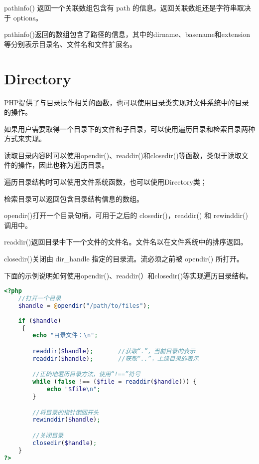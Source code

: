 pathinfo() 返回一个关联数组包含有 path 的信息。返回关联数组还是字符串取决于 options。



pathinfo()返回的数组包含了路径的信息，其中的dirname、basename和extension等分别表示目录名、文件名和文件扩展名。






\section{Directory}

PHP提供了与目录操作相关的函数，也可以使用目录类实现对文件系统中的目录的操作。

如果用户需要取得一个目录下的文件和子目录，可以使用遍历目录和检索目录两种方式来实现。


读取目录内容时可以使用opendir()、readdir()和closedir()等函数，类似于读取文件的操作，因此也称为遍历目录。

\begin{compactitem}
\item 遍历目录结构时可以使用文件系统函数，也可以使用Directory类；
\item 检索目录可以返回包含目录结构信息的数组。
\end{compactitem}

\begin{compactitem}
\item opendir()打开一个目录句柄，可用于之后的 closedir()，readdir() 和 rewinddir() 调用中。

\item readdir()返回目录中下一个文件的文件名。文件名以在文件系统中的排序返回。

\item closedir()关闭由 dir_handle 指定的目录流。流必须之前被 opendir() 所打开。

\end{compactitem}

下面的示例说明如何使用opendir()、readdir(）和closedir()等实现遍历目录结构。

\begin{lstlisting}[language=PHP]
<?php
	//打开一个目录
	$handle = @opendir("/path/to/files");
	
	if ($handle)
     {
		echo "目录文件：\n";

		readdir($handle);		//获取“.”，当前目录的表示
		readdir($handle);		//获取“..”，上级目录的表示

		//正确地遍历目录方法，使用“!==”符号
		while (false !== ($file = readdir($handle))) {
			echo "$file\n";
		}

		//将目录的指针倒回开头
		rewinddir($handle);

		//关闭目录
		closedir($handle);
	}
?>
\end{lstlisting}


